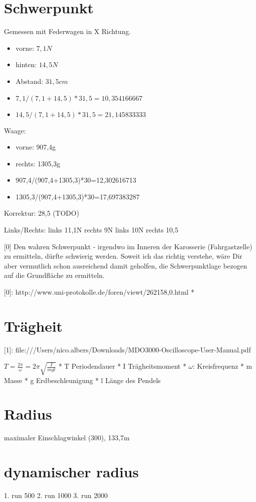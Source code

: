 \documentclass[12pt,final]{article}
\begin{document}
\section{Schwerpunkt}
Gemessen mit Federwagen in X Richtung.
\begin{itemize}
\item vorne: $7,1N$
\item hinten: $14,5N$
\item Abstand: $31,5cm$
\item $7,1/(7,1+14,5)*31,5 = 10,354166667$
\item $14,5/(7,1+14,5)*31,5 = 21,145833333$
\end{itemize}

Waage:

\begin{itemize}
\item vorne: 907,4g
\item rechts: 1305,3g
\item 907,4/(907,4+1305,3)*30=12,302616713
\item 1305,3/(907,4+1305,3)*30=17,697383287
\end{itemize}

Korrektur: 28,5 (TODO)

Links/Rechts:
links 11,1N rechts 9N
links 10N rechts 10,5

[0] Den wahren Schwerpunkt - irgendwo im Inneren der Karosserie (Fahrgastzelle) zu ermitteln, dürfte schwierig werden.
Soweit ich das richtig verstehe, wäre Dir aber vermutlich schon ausreichend damit geholfen, die Schwerpunktlage bezogen auf die Grundfläche zu ermitteln.

[0]: http://www.uni-protokolle.de/foren/viewt/262158,0.html
*


\section{Trägheit}
[1]: file:///Users/nico.albers/Downloads/MDO3000-Oscilloscope-User-Manual.pdf


$T=\frac{2\pi}{\omega} = 2\pi\sqrt{\frac{I}{mgl}}$
* T Periodendauer
* I Trägheitsmoment
* $\omega$: Kreisfrequenz
* m Masse
* g Erdbeschleunigung
* l Länge des Pendels



\section{Radius}
maximaler Einschlagwinkel (300), 133,7m


\section{dynamischer radius}
1. run 500
2. run 1000
3. run 2000
\end{document}
